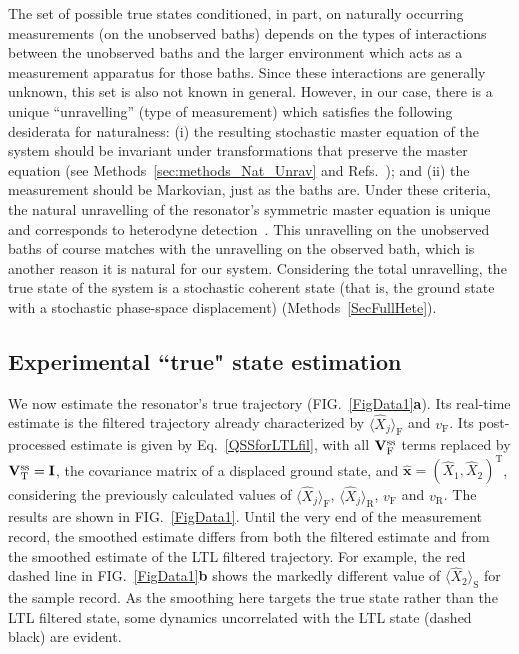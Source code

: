 \documentclass[aps,prx,twocolumn,amsmath,amssymb,superscriptaddress,floatfix,longbibliography
]{revtex4-2}
\begin{document}
The set of possible true states conditioned, in part, on naturally occurring measurements (on the unobserved baths) depends on the types of interactions between the unobserved baths and the larger environment which acts as a measurement apparatus for those baths. Since these interactions are generally unknown, this set is also not known in general. However, in our case, there is a unique ``unravelling'' (type of measurement) which satisfies the following desiderata for naturalness: (i) the resulting stochastic master equation of the system should be invariant under transformations that preserve the master equation (see Methods~\ref{sec:methods_Nat_Unrav} and Refs.~\cite{gisin1992quantum,gisin1992wave});
and (ii) the measurement should be Markovian, just as the baths are. Under these criteria, the natural unravelling of the resonator’s symmetric master equation is unique and corresponds to heterodyne detection~\cite{WisDio01}. This unravelling on the unobserved baths of course matches with the unravelling on the observed bath, which is another reason it is natural for our system. Considering the total unravelling, the true state of the system is a stochastic coherent state (that is, the ground state with a stochastic phase-space displacement) (Methods~\ref{SecFullHete}).

\subsection*{Experimental ``true" state estimation}

We now estimate the resonator's true trajectory (FIG.~\ref{FigData1}\textbf{a}). Its real-time estimate is the filtered trajectory already characterized by $\langle\hat{X}_{j}\rangle_\text{F}$ and $v_\text{F}$. Its post-processed estimate is given by Eq.~\eqref{QSSforLTLfil}, with all $\mathbf{V}_{\text F}^\text{ss}$ terms replaced by $\mathbf{V}_{\text T}^\text{ss}=\mathbf{I}$, the covariance matrix of a displaced ground state, and $\hat{\mathbf{x}}=(\hat{X}_1,\hat{X}_2)^\text{T}$, considering the previously calculated values of $\langle\hat{X}_{j}\rangle_\text{F}$, $\langle\hat{X}_{j}\rangle_\text{R}$, $v_\text{F}$ and $v_\text{R}$. The results are shown in FIG.~\ref{FigData1}. Until the very end of the measurement record, the smoothed estimate differs from both the filtered estimate and from the smoothed estimate of the LTL filtered trajectory. For example, the red dashed line in FIG.~\ref{FigData1}\textbf{b} shows the markedly different value of $\langle\hat{X}_2\rangle_\text{S}$ for the sample record. As the smoothing here targets the true state rather than the LTL filtered state, some dynamics uncorrelated with the LTL state (dashed black) are evident.
\end{document}
